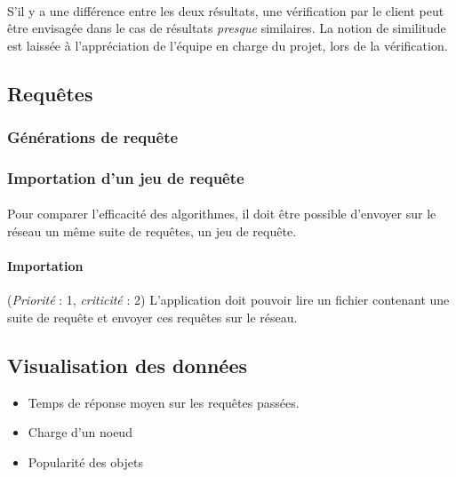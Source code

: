 \documentclass[12pt]{article}
\newcommand{\besoin}[2] {
  (\textit{Priorité} : #1, \textit{criticité} : #2)
}
\begin{document}
\paragraph{} S'il y a une différence entre les deux résultats, une vérification par le client peut être envisagée dans le cas de résultats \textit{presque} similaires. 
La notion de similitude est laissée à l'appréciation de l'équipe en charge du projet, lors de la vérification.



\subsection{Requêtes}

\subsubsection{Générations de requête}

\paragraph{} %


\subsubsection{Importation d'un jeu de requête}

\paragraph{} Pour comparer l'efficacité des algorithmes, il doit être possible d'envoyer sur le réseau un même suite de requêtes, un jeu de requête.

\paragraph{Importation} \besoin{1}{2} L'application doit pouvoir lire un fichier contenant une suite de requête et envoyer ces requêtes sur le réseau.


\subsection{Visualisation des données}

\begin{itemize}
 \item Temps de réponse moyen sur les requêtes passées.
 \item Charge d'un noeud
 \item Popularité des objets
\end{itemize}
\end{document}
